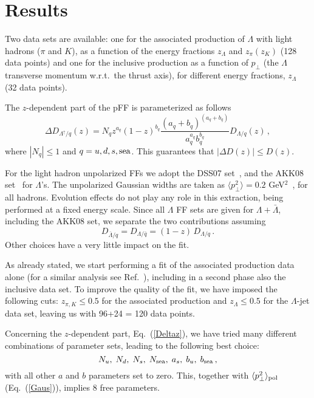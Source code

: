 \documentclass[submission, Proceedings]{SciPost}
\newcommand{\be}{\begin{equation}}
\newcommand{\ee}{\end{equation}}
\begin{document}
\section{Results}
\label{results}

Two data sets are available: one for the associated production of $\Lambda$ with light hadrons ($\pi$ and $K$), as a function of the energy fractions $z_\Lambda$ and $z_\pi(z_K)$  (128 data points) and one for the inclusive production as a function of $p_{\perp}$ (the $\Lambda$ transverse momentum w.r.t.~the thrust axis), for different energy fractions, $z_\Lambda$ (32 data points).
%

The $z$-dependent part of the pFF is parameterized as follows
\be
\Delta D_{\Lambda^\uparrow\!/q}(z) = N_q z^{a_q} (1-z)^{b_q} \frac{(a_q+b_q)^{(a_q+b_q)}}{a_q^{a_q}b_q^{b_q}} D_{\Lambda/q}(z)\,,
\label{Deltaz}
\ee
where $|N_q|\le 1$ and $q=u,d,s, \rm{sea}$. This guarantees that $|\Delta D(z)|\le D(z)$.

For the light hadron unpolarized FFs we adopt the DSS07 set~\cite{deFlorian:2007aj}, and the AKK08 set~\cite{Albino:2008fy} for $\Lambda$'s. The unpolarized Gaussian widths are taken as $\langle p^2_{\perp} \rangle = 0.2$ GeV$^2$~\cite{Anselmino:2005nn}, for all hadrons. Evolution effects do not play any role in this extraction, being performed at a fixed energy scale.
Since all $\Lambda$ FF sets are given for $\Lambda+\bar\Lambda$, including the AKK08 set, we separate the two contributions assuming
\be
D_{\bar\Lambda/q} = D_{\Lambda/\bar q} = (1-z) \, D_{\Lambda/q}  \,.
\ee
%
Other choices have a very little impact on the fit.

As already stated, we start performing a fit of the associated production data alone (for a similar analysis see Ref.~\cite{Callos:2020qtu}), including in a second phase also the inclusive data set. To improve the quality of the fit, we have imposed the following cuts: $z_{\pi,K} \le 0.5$ for the associated production and $z_\Lambda \le 0.5$ for the $\Lambda$-jet data set, leaving us with 96+24 = 120 data points.

Concerning the $z$-dependent part, Eq.~(\ref{Deltaz}), we have tried many different combinations of parameter sets, leading to the following best choice:
\be
N_u, \; N_d, \; N_s, \; N_{\rm sea}, \; a_s, \; b_u, \; b_{\rm sea}\,,
\ee
with all other $a$ and $b$ parameters set to zero. This, together with $\langle p^2_{\perp} \rangle_{\rm pol}$ (Eq.~(\ref{Gaus})), implies  8 free parameters.
\end{document}
